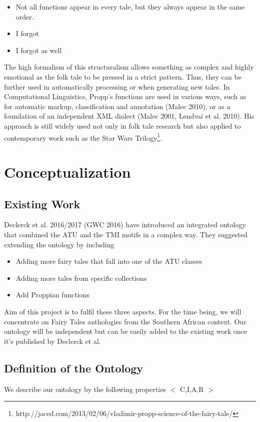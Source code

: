 \documentclass[10pt,a4paper]{article}
\begin{document}
	\begin{itemize}
		\item Not all functions appear in every tale, but they always appear in the same order. 
		\item I forgot
		\item I forgot as well 
	
	\end{itemize}
	
The high formalism of this structuralism allows something as complex and highly emotional as the folk tale to be pressed in a strict pattern. Thus, they can be further used in automatically processing or when generating new tales. In Computational Linguistics, Propp's functions are used in various ways, such as for automatic markup, classification and annotation (Malec 2010), or as a foundation of an independent XML dialect (Malec 2001,  Lendvai et al. 2010). 
	His approach is still widely used not only in folk tale research but also applied to contemporary work such as the Star Wars Trilogy\footnote{http://jaced.com/2013/02/06/vladimir-propp-science-of-the-fairy-tale/}.   

\section{Conceptualization}
	\subsection{Existing Work} 
	Declerck et al. 2016/2017 (GWC 2016) have introduced an integrated ontology that combined the ATU and the TMI motifs in a complex way. They suggested extending the ontology by including 
	
	\begin{itemize}
		\item Adding more fairy tales that fall into one of the ATU classes
		\item Adding more tales from specific collections
		\item Add Proppian functions
		
	\end{itemize}	  
	
	Aim of this project is to fulfil these three aspects. For the time being, we will concentrate on Fairy Tales anthologies from the Southern African context. Our ontology will be independent but can be easily added to the existing work once it's published by Declerck et al. 
	\subsection{Definition of the Ontology} 
	We describe our ontology by the following properties $<$ C,I,A,R $>$
\end{document}
